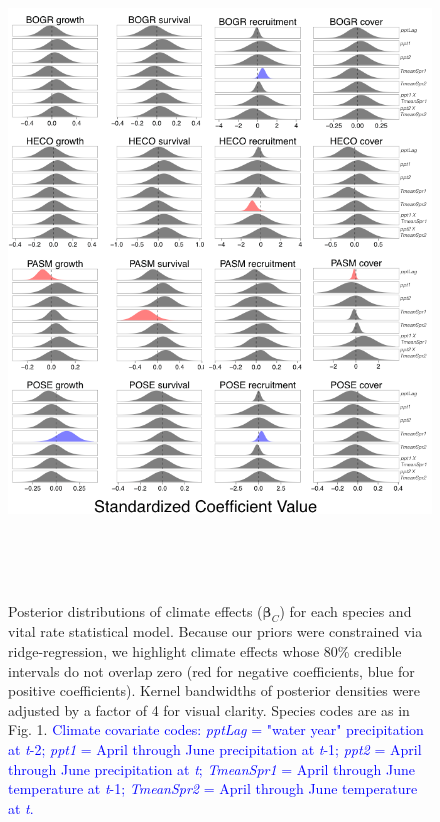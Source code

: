 \documentclass[12pt,]{article}
\begin{document}
\begin{figure}[!ht]
  \centering
      \includegraphics[height=7in]{./components/climate_posteriors_figure.png}
  \caption{Posterior distributions of climate effects ($\boldsymbol{\beta}_C$) for each species and vital rate statistical model. Because our priors were constrained via ridge-regression, we highlight climate effects whose 80\% credible intervals do not overlap zero (red for negative coefficients, blue for positive coefficients). Kernel bandwidths of posterior densities were adjusted by a factor of 4 for visual clarity. Species codes are as in Fig. 1. \textcolor{blue}{Climate covariate codes: \emph{pptLag} = "water year" precipitation at \emph{t}-2; \emph{ppt1} = April through June precipitation at \emph{t}-1; \emph{ppt2} = April through June precipitation at \emph{t}; \emph{TmeanSpr1} = April through June temperature at \emph{t}-1; \emph{TmeanSpr2} = April through June temperature at \emph{t}.}}
\end{figure}
\end{document}
